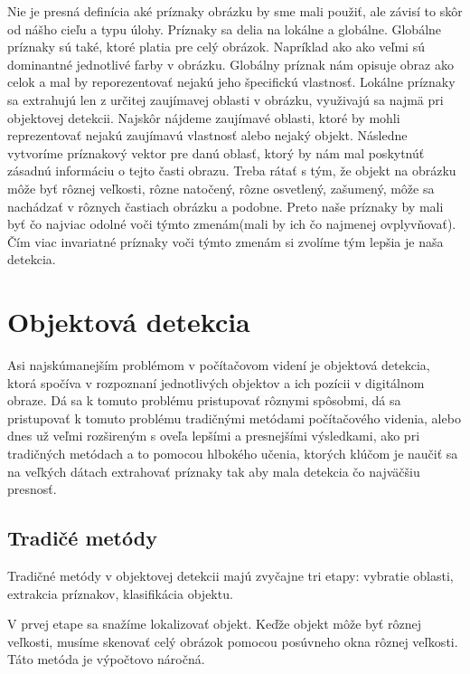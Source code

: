 Nie je presná definícia aké príznaky obrázku by sme mali použiť, ale závisí to skôr od nášho cieľu a typu úlohy. Príznaky sa delia na lokálne a globálne. Globálne príznaky sú také, ktoré platia pre celý obrázok. Napríklad ako ako veľmi sú dominantné jednotlivé farby v obrázku. Globálny príznak nám opisuje obraz ako celok a mal by reporezentovať nejakú jeho špecifickú vlastnosť. Lokálne príznaky sa extrahujú len z určitej zaujímavej oblasti v obrázku, využivajú sa najmä pri objektovej detekcii. Najskôr nájdeme zaujímavé oblasti, ktoré by mohli reprezentovať nejakú zaujímavú vlastnosť alebo nejaký objekt. Následne vytvoríme príznakový vektor pre danú oblasť, ktorý by nám mal poskytnúť zásadnú informáciu o tejto časti obrazu. Treba rátať s tým, že objekt na obrázku môže byť rôznej veľkosti, rôzne natočený, rôzne osvetlený, zašumený, môže sa nachádzať v rôznych častiach obrázku a podobne. Preto naše príznaky by mali byť čo najviac odolné voči týmto zmenám(mali by ich čo najmenej ovplyvňovať). Čím viac invariatné príznaky voči týmto zmenám si zvolíme tým lepšia je naša detekcia. 

\section{Objektová detekcia}

\hspace{\parindent}Asi najskúmanejším problémom v počítačovom videní je objektová detekcia, ktorá spočíva v rozpoznaní jednotlivých objektov a ich pozícii v digitálnom obraze. Dá sa k tomuto problému pristupovať rôznymi spôsobmi, dá sa pristupovať k tomuto problému tradičnými metódami počítačového videnia, alebo dnes už veľmi rozšireným s oveľa lepšími a presnejšími výsledkami, ako pri tradičných metódach a to pomocou hlbokého učenia, ktorých klúčom je naučiť sa na veľkých dátach extrahovať príznaky tak aby mala detekcia čo najväčšiu presnosť.

\subsection{Tradičé metódy}
\hspace{\parindent}Tradičné metódy v objektovej detekcii majú zvyčajne tri etapy: vybratie oblasti, extrakcia príznakov, klasifikácia objektu. 

V prvej etape sa snažíme lokalizovať objekt. Keďže objekt môže byť rôznej veľkosti, musíme skenovať celý obrázok pomocou posúvneho okna rôznej veľkosti. Táto metóda je výpočtovo náročná. 

